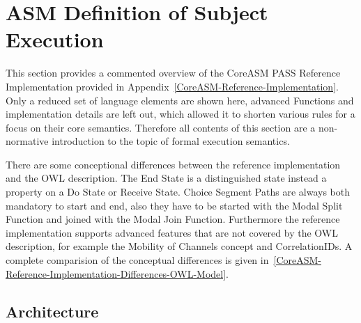 \section{ASM Definition of Subject Execution}


This section provides a commented overview of the CoreASM PASS Reference Implementation provided in Appendix~\ref{CoreASM-Reference-Implementation}.
Only a reduced set of language elements are shown here, advanced Functions and implementation details are left out,
which allowed it to shorten various rules for a focus on their core semantics.
Therefore all contents of this section are a non-normative introduction to the topic of formal execution semantics.

There are some conceptional differences between the reference implementation and the OWL description.
The End State is a distinguished state instead a property on a Do State or Receive State.
Choice Segment Paths are always both mandatory to start and end, also they have to be started with the Modal Split Function and joined with the Modal Join Function.
Furthermore the reference implementation supports advanced features that are not covered by the OWL description, for example the Mobility of Channels concept and CorrelationIDs.
A complete comparision of the conceptual differences is given in~\ref{CoreASM-Reference-Implementation-Differences-OWL-Model}.



\subsection{Architecture}

